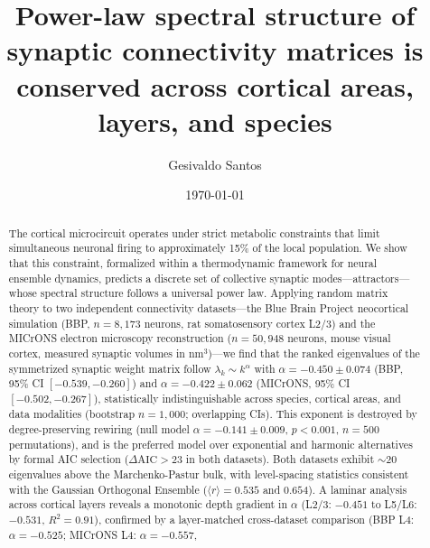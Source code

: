 \documentclass[aps,pre,twocolumn,showpacs,superscriptaddress,longbibliography]{revtex4-2}
\newcommand{\rGOE}{\langle r \rangle}
\begin{document}
\title{Power-law spectral structure of synaptic connectivity matrices
       is conserved across cortical areas, layers, and species}

\author{Gesivaldo Santos}

\date{\today}

\begin{abstract}
The cortical microcircuit operates under strict metabolic constraints
that limit simultaneous neuronal firing to approximately 15\% of the
local population. We show that this constraint, formalized within a
thermodynamic framework for neural ensemble dynamics, predicts a
discrete set of collective synaptic modes---attractors---whose spectral
structure follows a universal power law. Applying random matrix theory
to two independent connectivity datasets---the Blue Brain Project
neocortical simulation (BBP, $n=8{,}173$ neurons, rat somatosensory
cortex L2/3) and the MICrONS electron microscopy reconstruction
($n=50{,}948$ neurons, mouse visual cortex, measured synaptic volumes
in nm$^3$)---we find that the ranked eigenvalues of the symmetrized
synaptic weight matrix follow $\lambda_k \sim k^\alpha$ with
$\alpha = {-}0.450 \pm 0.074$ (BBP, 95\% CI $[-0.539, -0.260]$)
and $\alpha = {-}0.422 \pm 0.062$ (MICrONS, 95\% CI $[-0.502, -0.267]$),
statistically indistinguishable across species, cortical areas, and
data modalities (bootstrap $n = 1{,}000$; overlapping CIs).
This exponent is destroyed by degree-preserving rewiring
(null model $\alpha = {-}0.141 \pm 0.009$, $p < 0.001$,
$n = 500$ permutations), and is the preferred model over exponential
and harmonic alternatives by formal AIC selection ($\Delta\mathrm{AIC} > 23$
in both datasets). Both datasets exhibit $\sim$20 eigenvalues above the
Marchenko-Pastur bulk, with level-spacing statistics consistent with the
Gaussian Orthogonal Ensemble ($\rGOE = 0.535$ and $0.654$).
A laminar analysis across cortical layers reveals a monotonic depth
gradient in $\alpha$ (L2/3: $-0.451$ to L5/L6: $-0.531$,
$R^2 = 0.91$), confirmed by a layer-matched cross-dataset comparison
(BBP L4: $\alpha = -0.525$; MICrONS L4: $\alpha = -0.557$,

\end{abstract}
\end{document}
